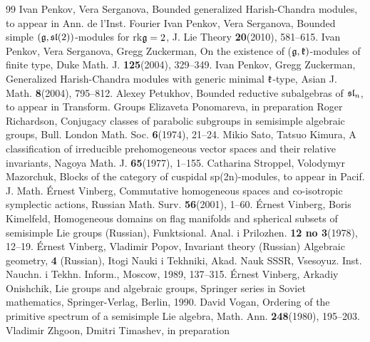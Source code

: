 \documentclass[12pt]{amsart}
\theoremstyle{definition}\newtheorem{theorem}{Theorem}[section]
\theoremstyle{definition}\newtheorem{definition}[proposition]{Definition}
\theoremstyle{remark}\newtheorem{example}[proposition]{Example}
\begin{document}
\begin{thebibliography}{99}
 Ivan Penkov, Vera Serganova, Bounded generalized Harish-Chandra modules, to appear in Ann. de l'Inst. Fourier
 Ivan Penkov, Vera Serganova, Bounded simple $(\frak g, \frak{sl}(2))$-modules for rk$\frak g=2$, J. Lie Theory {\bf20}(2010), 581--615.
 Ivan Penkov, Vera Serganova, Gregg Zuckerman, On the existence of ($\frak g, \frak k)$-modules of finite type, Duke Math. J. {\bf125}(2004), 329--349.
 Ivan Penkov, Gregg Zuckerman, Generalized Harish-Chandra modules with generic minimal $\frak k$-type, Asian J. Math. {\bf8}(2004), 795--812.
 Alexey Petukhov, Bounded reductive subalgebras of $\frak{sl}_n$, to appear in Transform. Groups
 Elizaveta Ponomareva, in preparation
 Roger Richardson, Conjugacy classes of parabolic subgroups in semisimple algebraic groups, Bull. London Math. Soc. {\bf6}(1974), 21--24.
 Mikio Sato, Tatsuo Kimura, A classification of irreducible prehomogeneous vector spaces and their relative invariants,
Nagoya Math. J. {\bf65}(1977), 1--155.
 Catharina  Stroppel, Volodymyr Mazorchuk, Blocks of the category of cuspidal sp(2n)-modules, to appear in  Pacif. J. Math.
 \'Ernest Vinberg, Commutative homogeneous spaces and co-isotropic symplectic actions, Russian Math. Surv. {\bf56}(2001), 1--60.
 \'Ernest Vinberg, Boris Kimelfeld, Homogeneous domains on flag manifolds and spherical subsets of semisimple Lie groups (Russian),  Funktsional. Anal. i Prilozhen. {\bf12 no 3}(1978), 12--19.
 \'Ernest Vinberg, Vladimir Popov, Invariant theory (Russian)  Algebraic geometry, {\bf4} (Russian), Itogi Nauki i Tekhniki, Akad. Nauk SSSR, Vsesoyuz. Inst. Nauchn. i Tekhn. Inform., Moscow, 1989, 137--315.
 \'Ernest Vinberg, Arkadiy Onishchik, Lie groups and algebraic groups, Springer series in Soviet mathematics, Springer-Verlag, Berlin, 1990.
 David Vogan, Ordering of the primitive spectrum of a semisimple Lie algebra, Math. Ann. {\bf248}(1980), 195--203.
 Vladimir Zhgoon, Dmitri Timashev, in preparation
\end{thebibliography}
\end{document}
